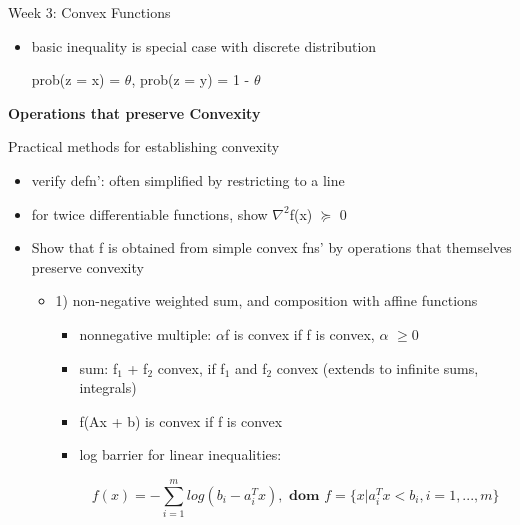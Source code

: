 \documentclass{article}
\begin{document}
\begin{homeworkProblemName}{{\LARGE Week 3: Convex Functions}}
\begin{problemAnswer}
{\begin{itemize}
\begin{itemize}
          $$ f(\textbf{E}z) \leq \textbf{E} f(z)$$

          for any random variable z

          \item basic inequality is special case with discrete distribution

          prob(z = x) = $\theta$, prob(z = y) = 1 - $\theta$
        \end{itemize}

      \end{itemize}
    }\end{problemAnswer}

  \newpage

  \vspace{0.2 cm} \textbf{{\large Operations that preserve Convexity}}

  \begin{problemAnswer}{

    Practical methods for establishing convexity

    \begin{itemize}
    \item verify defn': often simplified by restricting to a line
    \item for twice differentiable functions, show $\nabla^2$f(x) $\succeq$ 0
    \item Show that f is obtained from simple convex fns' by operations that
      themselves preserve convexity

      \begin{itemize}

        \item 1) non-negative weighted sum, and composition with affine
        functions
        \begin{itemize}

        \item nonnegative multiple: $\alpha$f is convex if f is convex, $\alpha$ $\geq$0

        \item sum: f$_1$ + f$_2$ convex, if f$_1$ and f$_2$ convex (extends to
          infinite sums, integrals)

        \item  f(Ax + b) is convex if f is convex

        \item log barrier for linear inequalities:

          $$ f(x) = - \sum_{i=1}^m log(b_i - a_i^Tx), \textbf{ dom } f = \{x | a_i^Tx
          < b_i, i=1,...,m\}$$


\end{itemize}
\end{itemize}
\end{itemize}}
\end{problemAnswer}
\end{homeworkProblemName}
\end{document}
